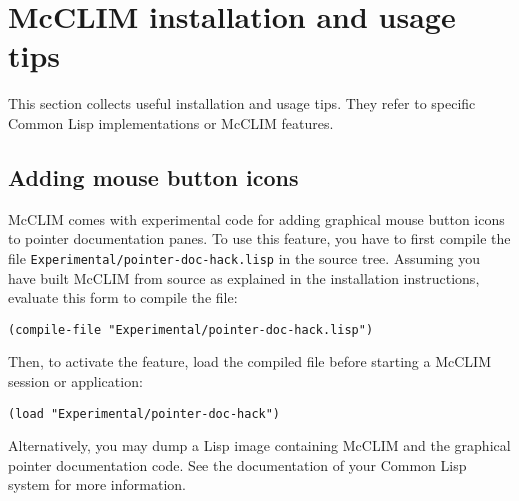 \section{McCLIM installation and usage tips}

This section collects useful installation and usage tips.  They refer to
specific Common Lisp implementations or McCLIM features.

\subsection{Adding mouse button icons}

McCLIM comes with experimental code for adding graphical mouse button
icons to pointer documentation panes.  To use this feature, you have to
first compile the file \texttt{Experimental/pointer-doc-hack.lisp} in the
source tree.  Assuming you have built McCLIM from source as explained in
the installation instructions, evaluate this form to compile the file:
\begin{verbatim}
(compile-file "Experimental/pointer-doc-hack.lisp")
\end{verbatim}
Then, to activate the feature, load the compiled file before starting a
McCLIM session or application:
\begin{verbatim}
(load "Experimental/pointer-doc-hack")
\end{verbatim}
Alternatively, you may dump a Lisp image containing McCLIM and the
graphical pointer documentation code.  See the documentation of your
Common Lisp system for more information.

